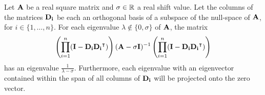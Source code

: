 \begin{theorem}\label{the:c4_projection_deflation}
    Let $\vb{A}$ be a real square matrix and $\sigma \in \mathbb{R}$ a real shift value. Let the columns of the matrices $\vb{D_i}$ be each an orthogonal basis of a subspace of the null-space of $\vb{A}$, for $i \in \{1, \dots, n\}$. For each eigenvalue $\lambda \notin \{0,\sigma\}$ of $\vb{A}$, the matrix
    \begin{equation}\label{equ:c4_projection_deflation}
        \left(\prod_{i=1}^{n}(\vb{I} - \vb{D_i}{\vb{D_i}}^\intercal)\right) (\vb{A} - \sigma \vb{I})^{-1} \left(\prod_{i=1}^{n}(\vb{I} - \vb{D_i}{\vb{D_i}}^\intercal)\right)
    \end{equation}
    has an eigenvalue $\frac{1}{\lambda - \sigma}$. Furthermore, each eigenvalue with an eigenvector contained within the span of all columns of $\vb{D_i}$ will be projected onto the zero vector.
\end{theorem}
